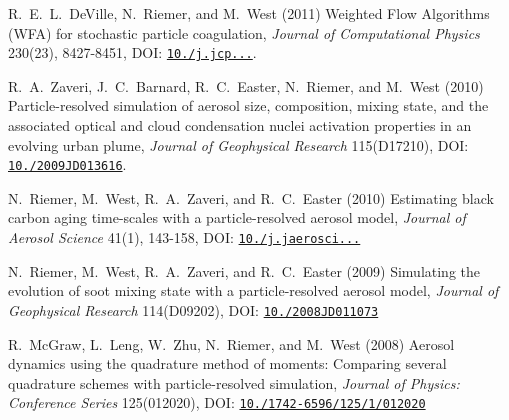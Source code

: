 \begin{DoxyItemize}
\item R.~E.~L.~De\+Ville, N.~Riemer, and M.~West (2011) Weighted Flow Algorithms (W\+FA) for stochastic particle coagulation, {\itshape Journal of Computational Physics} 230(23), 8427-\/8451, D\+OI\+: \href{http://dx.doi.org/10.1016/j.jcp.2011.07.027}{\tt 10./j.jcp...}.
\item R.~A.~Zaveri, J.~C.~Barnard, R.~C.~Easter, N.~Riemer, and M.~West (2010) Particle-\/resolved simulation of aerosol size, composition, mixing state, and the associated optical and cloud condensation nuclei activation properties in an evolving urban plume, {\itshape Journal of Geophysical Research} 115(D17210), D\+OI\+: \href{http://dx.doi.org/10.1029/2009JD013616}{\tt 10./2009\+J\+D013616}.
\item N.~Riemer, M.~West, R.~A.~Zaveri, and R.~C.~Easter (2010) Estimating black carbon aging time-\/scales with a particle-\/resolved aerosol model, {\itshape Journal of Aerosol Science} 41(1), 143-\/158, D\+OI\+: \href{http://dx.doi.org/10.1016/j.jaerosci.2009.08.009}{\tt 10./j.jaerosci...}
\item N.~Riemer, M.~West, R.~A.~Zaveri, and R.~C.~Easter (2009) Simulating the evolution of soot mixing state with a particle-\/resolved aerosol model, {\itshape Journal of Geophysical Research} 114(D09202), D\+OI\+: \href{http://dx.doi.org/10.1029/2008JD011073}{\tt 10./2008\+J\+D011073}
\item R.~Mc\+Graw, L.~Leng, W.~Zhu, N.~Riemer, and M.~West (2008) Aerosol dynamics using the quadrature method of moments\+: Comparing several quadrature schemes with particle-\/resolved simulation, {\itshape Journal of Physics\+: Conference Series} 125(012020), D\+OI\+: \href{http://dx.doi.org/10.1088/1742-6596/125/1/012020}{\tt 10./1742-\/6596/125/1/012020} 
\end{DoxyItemize}